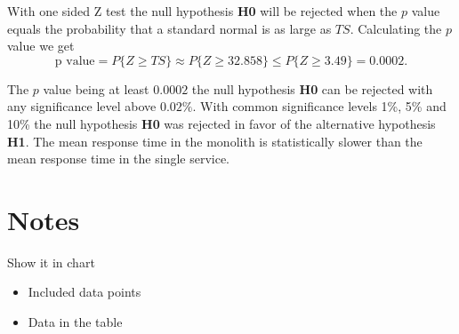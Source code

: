 With one sided Z test the null hypothesis \textbf{H0} will be rejected when the $p$ value 
equals the probability that a standard normal is as large as $TS$. Calculating the $p$ value we get %
\[
\text{p value} = P\{Z\geq TS\} \approx P\{Z\geq 32.858\} \leq P\{Z\geq 3.49\} = 0.0002
.\]

The $p$ value being at least $0.0002$ the null hypothesis \textbf{H0} can be rejected with any significance level above $0.02\%$.
With common significance levels 1\%, 5\% and 10\% the null hypothesis \textbf{H0} was rejected in favor of the alternative hypothesis \textbf{H1}.
The mean response time in the monolith is statistically slower than the mean response time in the single service.

\section{Notes}

Show it in chart
\begin{itemize}
    \item Included data points
    \item Data in the table
\end{itemize}